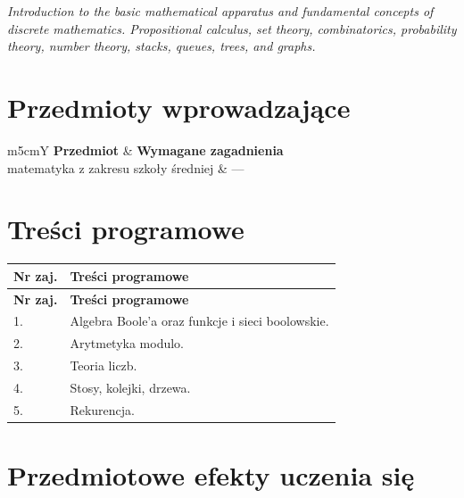 \documentclass[12pt, a4paper]{article}
\newcommand{\thdrule}{\noalign{\global\setlength{\extrarowheight}{0pt}}}
\newcommand{\thdend}{\noalign{\global\setlength{\extrarowheight}{3pt}}}
\begin{document}
\textit{Introduction to the basic mathematical apparatus and fundamental concepts of discrete mathematics. Propositional calculus, set theory, combinatorics, probability theory, number theory, stacks, queues, trees, and graphs.}


\section{Przedmioty wprowadzające}

{\scriptsize
\begin{tabularx}{\textwidth}{m{5cm}Y}
\thdrule\toprule
{} {\color{white}\textbf{Przedmiot}} & {\color{white}\textbf{Wymagane zagadnienia}} \\
\midrule\thdend
   matematyka z zakresu szkoły średniej & --- \\
\bottomrule
\end{tabularx}}

\section{Treści programowe}

{\scriptsize
\begin{longtable}{m{1.5cm}m{14.5cm}}
\thdrule\toprule
\rowcolor{pjatkRed} {\color{white}\textbf{Nr zaj.}} & {\color{white}\textbf{Treści programowe}} \\
\midrule\thdend
\endfirsthead
\thdrule\toprule
\rowcolor{pjatkRed} {\color{white}\textbf{Nr zaj.}} & {\color{white}\textbf{Treści programowe}} \\
\midrule\thdend
\endhead
  \rowcolor{tableRowLight} 1. & Algebra Boole’a oraz funkcje i sieci boolowskie. \\
  \rowcolor{tableRowAlt} 2. & Arytmetyka modulo. \\
  \rowcolor{tableRowLight} 3. & Teoria liczb. \\
  \rowcolor{tableRowAlt} 4. & Stosy, kolejki, drzewa. \\
  \rowcolor{tableRowLight} 5. & Rekurencja. \\
\bottomrule
\end{longtable}}

\section{Przedmiotowe efekty uczenia się}
\end{document}
